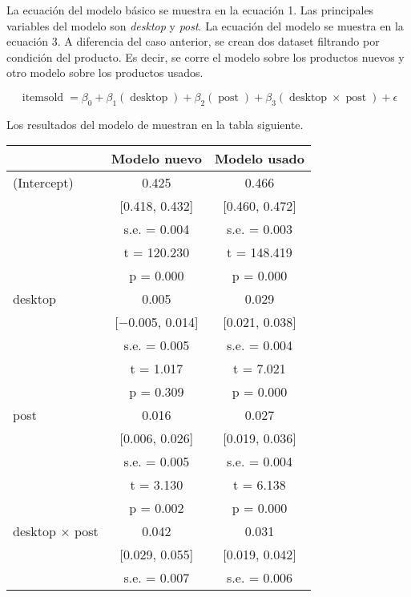 \documentclass[
  12pt]{article}
\begin{document}
La ecuación del modelo básico se muestra en la ecuación 1. Las principales variables del modelo son \emph{desktop} y \emph{post}. La ecuación del modelo se muestra en la ecuación 3. A diferencia del caso anterior, se crean dos dataset filtrando por condición del producto. Es decir, se corre el modelo sobre los productos nuevos y otro modelo sobre los productos usados.

\begin{equation}
\operatorname{itemsold} = \beta_{0} + \beta_{1}(\operatorname{desktop}) + \beta_{2}(\operatorname{post}) + \beta_{3}(\operatorname{desktop} \times \operatorname{post}) + \epsilon
\end{equation}

Los resultados del modelo de muestran en la tabla siguiente.

\begin{table}[H]
\centering
\begin{tabular}[t]{lcc}
\toprule
  & Modelo nuevo & Modelo usado\\
\midrule
(Intercept) & \num{0.425} & \num{0.466}\\
 & {}[\num{0.418}, \num{0.432}] & {}[\num{0.460}, \num{0.472}]\\
 & s.e. = \num{0.004} & s.e. = \num{0.003}\\
 & t = \num{120.230} & t = \num{148.419}\\
 & p = \num{0.000} & p = \vphantom{1} \num{0.000}\\
desktop & \num{0.005} & \num{0.029}\\
 & {}[\num{-0.005}, \num{0.014}] & {}[\num{0.021}, \num{0.038}]\\
 & s.e. = \num{0.005} & s.e. = \vphantom{1} \num{0.004}\\
 & t = \num{1.017} & t = \num{7.021}\\
 & p = \num{0.309} & p = \num{0.000}\\
post & \num{0.016} & \num{0.027}\\
 & {}[\num{0.006}, \num{0.026}] & {}[\num{0.019}, \num{0.036}]\\
 & s.e. = \num{0.005} & s.e. = \num{0.004}\\
 & t = \num{3.130} & t = \num{6.138}\\
 & p = \num{0.002} & p = \num{0.000}\\
desktop × post & \num{0.042} & \num{0.031}\\
 & {}[\num{0.029}, \num{0.055}] & {}[\num{0.019}, \num{0.042}]\\
 & s.e. = \num{0.007} & s.e. = \num{0.006}\\

\end{tabular}
\end{table}
\end{document}
